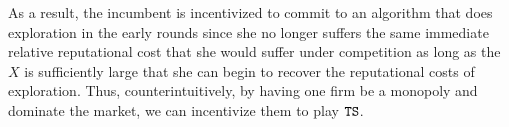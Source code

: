 \documentclass[../competing_bandits.tex]{subfiles}
\begin{document}
As a result, the incumbent is incentivized to commit to an algorithm that does exploration in the early rounds since she no longer suffers the same immediate relative reputational cost that she would suffer under competition as long as the $X$ is sufficiently large that she can begin to recover the reputational costs of exploration. Thus, counterintuitively, by having one firm be a monopoly and dominate the market, we can incentivize them to play $\mathtt{TS}$.
\end{document}
